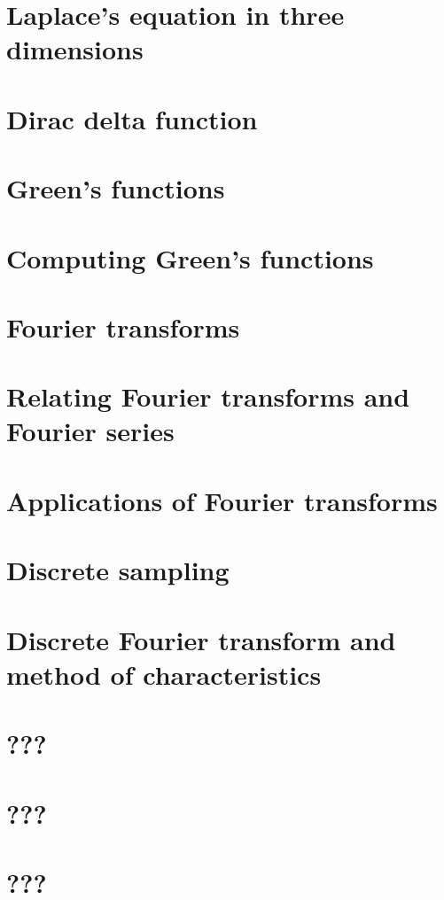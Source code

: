 \documentclass{article}
\begin{document}
\section{Laplace's equation in three dimensions}

\section{Dirac delta function}

\section{Green's functions}

\section{Computing Green's functions}

\section{Fourier transforms}

\section{Relating Fourier transforms and Fourier series}

\section{Applications of Fourier transforms}

\section{Discrete sampling}

\section{Discrete Fourier transform and method of characteristics}

\section{???}

\section{???}

\section{???}

\end{document}
